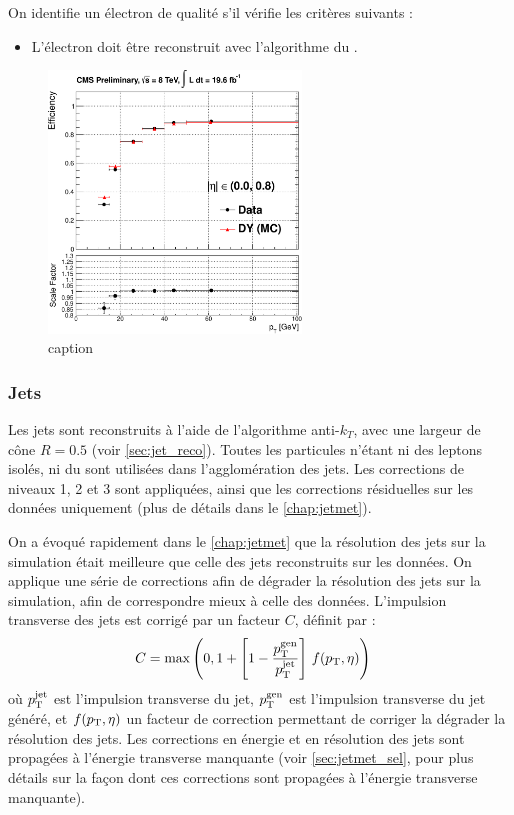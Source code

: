 On identifie un électron de qualité s'il vérifie les critères suivants :
\begin{itemize}
  \item L'électron doit être reconstruit avec l'algorithme du \pf.
\end{itemize}

\begin{figure}[htbp]
  \centering
  \includegraphics[width=0.6\textwidth]{chapitre7/figs/electron_id_eff.pdf}
  \caption{caption}
  \label{fig:label}
\end{figure}

\subsubsection{Jets}

Les jets sont reconstruits à l'aide de l'algorithme anti-$k_T$, avec une largeur de cône $R = \num{0.5}$ (voir \cref{sec:jet_reco}). Toutes les particules \pf n'étant ni des leptons isolés, ni du \pu sont utilisées dans l'agglomération des jets. Les corrections de niveaux 1, 2 et 3 sont appliquées, ainsi que les corrections résiduelles sur les données uniquement (plus de détails dans le \cref{chap:jetmet}).

On a évoqué rapidement dans le \cref{chap:jetmet} que la résolution des jets sur la simulation était meilleure que celle des jets reconstruits sur les données. On applique une série de corrections afin de dégrader la résolution des jets sur la simulation, afin de correspondre mieux à celle des données. L'impulsion transverse des jets est corrigé par un facteur $C$, définit par :
\begin{align*}
  C &= \max\left(0, 1 + \left[ 1 - \frac{p_{\mathrm{T}}^\text{gen}}{p_{\mathrm{T}}^\text{jet}} \right] \, f(p_{\mathrm{T}}, \eta)\right)
\end{align*}
où $p_{\mathrm{T}}^\text{jet}$ est l'impulsion transverse du jet, $p_{\mathrm{T}}^\text{gen}$ est l'impulsion transverse du jet généré, et $f(p_{\mathrm{T}}, \eta)$ un facteur de correction permettant de corriger la dégrader la résolution des jets. Les corrections en énergie et en résolution des jets sont propagées à l'énergie transverse manquante (voir \cref{sec:jetmet_sel},  pour plus détails sur la façon dont ces corrections sont propagées à l'énergie transverse manquante).

